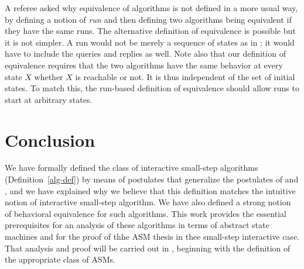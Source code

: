 \documentclass{LMCS}
\theoremstyle{definition}
\begin{document}
A referee asked why equivalence of algorithms is not defined in a more
usual way, by defining a notion of \emph{run} and then defining two
algorithms being equivalent if they have the same runs.  The
alternative definition of equivalence is possible but it is not
simpler.  A run would not be merely a sequence of states as in
\cite{seqth, parth}; it would have to include the queries and replies
as well.  Note also that our definition of equivalence requires that
the two algorithms have the same behavior at every state $X$ whether
$X$ is reachable or not.  It is thus independent of the set of initial
states.  To match this, the run-based definition of equivalence should
allow runs to start at arbitrary states.

\section{Conclusion}

We have formally defined the class of interactive small-step
algorithms (Definition~\ref{alg-def}) by means of postulates that
generalize the postulates of \cite{seqth} and \cite{oa1}, and we have
explained why we believe that this definition matches the intuitive
notion of interactive small-step algorithm.  We have also defined a
strong notion of behavioral equivalence for such algorithms.  This
work provides the essential prerequisites for an analysis of these
algorithms in terms of abstract state machines and for the proof of
thhe ASM thesis in thee small-step interactive case.  That analysis
and proof will be carried out in \cite{ga2}, beginning with the
definition of the appropriate class of ASMs.
\end{document}
